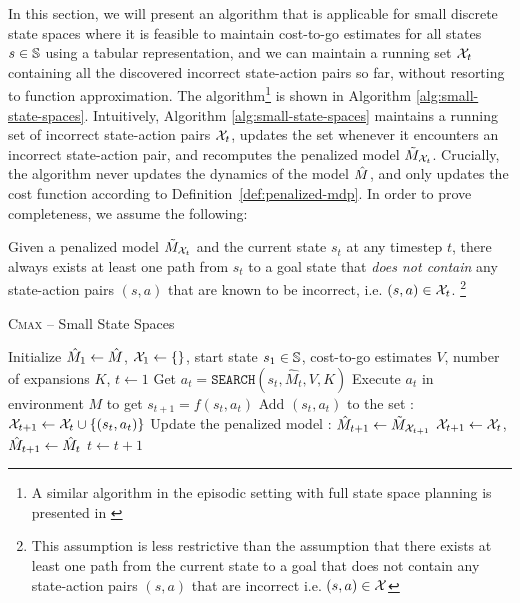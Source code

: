 In this section, we will present an algorithm that is applicable for
small discrete state spaces where it is feasible to maintain cost-to-go
estimates for all states $s \in \mathbb{S}$ using a tabular representation, and we can maintain a
running set $\mathcal{X}_t$ containing all the discovered incorrect state-action pairs
so far, without resorting to function approximation. The algorithm\footnote{A similar algorithm in the
  episodic setting with full state space planning is presented in \cite{DBLP:conf/aaai/Jiang18}} is shown in Algorithm
\ref{alg:small-state-spaces}.
Intuitively, Algorithm \ref{alg:small-state-spaces} maintains a
running set of incorrect state-action pairs
$\mathcal{X}_t$, updates the set whenever it encounters an incorrect
state-action pair, and recomputes the penalized model
$\tilde{M}_{\mathcal{X}_t}$. Crucially, the algorithm never updates the
dynamics of the model $\hat{M}$, and only updates the cost
function according to Definition~\ref{def:penalized-mdp}.
In order to prove completeness, we assume the following:
\begin{assumption}
  Given a penalized model $\tilde{M}_{\mathcal{X}_t}$ and the current
  state $s_t$ at any timestep $t$, there always exists at least one path from $s_t$ to a goal
  state that \textit{does not contain} any state-action pairs $(s, a)$ that are known to
  be incorrect, i.e. $(s, a) \in \mathcal{X}_t$. \footnote{This
    assumption is less restrictive than the assumption that
    there exists at least one path from the current state to a goal
    that does not contain any state-action pairs $(s, a)$ that are incorrect i.e. $(s,
    a) \in \mathcal{X}$}
  \label{assumption:core}
\end{assumption}

\begin{algorithm}[t]
  \caption{\textsc{Cmax} -- Small State Spaces}
  {\normalsize
  \begin{algorithmic}[1]
    \State Initialize $\hat{M}_1 \leftarrow \hat{M}$,
    $\mathcal{X}_1 \leftarrow \{\}$, start state $s_1 \in
    \mathbb{S}$, cost-to-go estimates $V$, number of expansions $K$,
    $t \leftarrow 1$
    \State Get $a_t = \mathtt{SEARCH}(s_t, \hat{M}_t, V, K)$
    \State Execute $a_t$ in environment $M$ to get $s_{t+1} = f(s_t, a_t)$
    \State Add $(s_t, a_t)$ to the set : $\mathcal{X}_{t+1} \leftarrow \mathcal{X}_t \cup
    \{(s_t, a_t)\}$
    \State Update the penalized model : $\hat{M}_{t+1} \leftarrow
    \tilde{M}_{\mathcal{X}_{t+1}}$
    \Else
    \State $\mathcal{X}_{t+1} \leftarrow \mathcal{X}_t$,
    $\hat{M}_{t+1} \leftarrow \hat{M}_t$
    \EndIf
    \State $t \leftarrow t + 1$
    \EndWhile
  \end{algorithmic}}
  \label{alg:small-state-spaces}
\end{algorithm}

